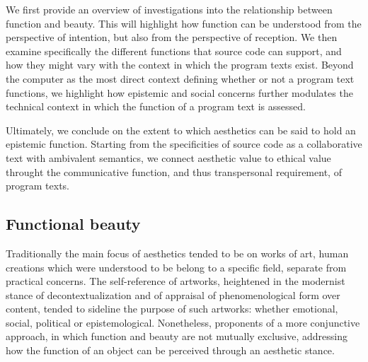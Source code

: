 We first provide an overview of investigations into the relationship between function and beauty. This will highlight how function can be understood from the perspective of intention, but also from the perspective of reception. We then examine specifically the different functions that source code can support, and how they might vary with the context in which the program texts exist. Beyond the computer as the most direct context defining whether or not a program text functions, we highlight how epistemic and social concerns further modulates the technical context in which the function of a program text is assessed.

Ultimately, we conclude on the extent to which aesthetics can be said to hold an epistemic function. Starting from the specificities of source code as a collaborative text with ambivalent semantics, we connect aesthetic value to  ethical value throught the communicative function, and thus transpersonal requirement, of program texts.

\subsection{Functional beauty}
\label{subsec:functional-beauty}

Traditionally the main focus of aesthetics tended to be on works of art, human creations which were understood to be belong to a specific field, separate from practical concerns. The self-reference of artworks, heightened in the modernist stance of decontextualization and of appraisal of phenomenological form over content, tended to sideline the purpose of such artworks: whether emotional, social, political or epistemological. Nonetheless, proponents of a more conjunctive approach, in which function and beauty are not mutually exclusive, addressing how the function of an object can be perceived through an aesthetic stance.

